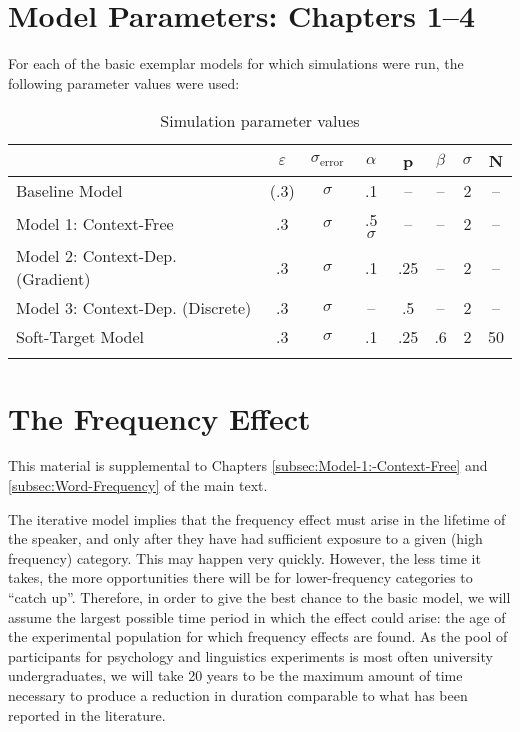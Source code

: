 \chapter{\label{chap:Appendix A}Model Parameters: Chapters 1--4}

For each of the basic exemplar models for which simulations were run,
the following parameter values were used:

\begin{table}[H]

\caption{Simulation parameter values}
\begin{tabular}{lScSSScc}
\lsptoprule
 & {$\varepsilon$} & {$\sigma_{\text{error}}$} & $\alpha$ & {p} & {$\beta$} & $\sigma$ & N\tabularnewline
\midrule
Baseline Model  & (.3) & $\sigma$ & .1 & – & – & 2 & –\tabularnewline
Model 1: Context-Free  & .3 & $\sigma$ & .5$\sigma$ & – & – & 2 & –\tabularnewline
Model 2: Context-Dep. (Gradient)  & .3 & $\sigma$ & .1 & .25 & – & 2 & –\tabularnewline
Model 3: Context-Dep. (Discrete)  & .3 & $\sigma$ & – & .5 & – & 2 & –\tabularnewline
Soft-Target Model  & .3 & $\sigma$ & .1 & .25 & .6 & 2 & 50\tabularnewline
\lspbottomrule
\end{tabular}

\end{table}


\chapter{\label{chap:Appendix B}The Frequency Effect}

This material is supplemental to Chapters \ref{subsec:Model-1:-Context-Free}
and \ref{subsec:Word-Frequency} of the main text.

The iterative model implies that the frequency effect must arise in
the lifetime of the speaker, and only after they have had sufficient
exposure to a given (high frequency) category. This may happen very
quickly. However, the less time it takes, the more opportunities there
will be for lower-frequency categories to “catch up”. Therefore,
in order to give the best chance to the basic model, we will assume
the largest possible time period in which the effect could arise:
the age of the experimental population for which frequency effects
are found. As the pool of participants for psychology and linguistics
experiments is most often university undergraduates, we will take
20 years to be the maximum amount of time necessary to produce a reduction
in duration comparable to what has been reported in the literature.

